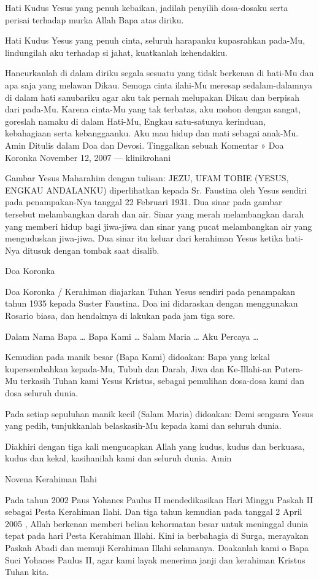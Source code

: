 \documentclass[a5paper,headsepline,titlepage,11pt,nnormalheadings,DIVcalc]{scrbook}
\begin{document}
Hati Kudus Yesus yang penuh kebaikan, jadilah penyilih dosa-dosaku serta perisai terhadap murka Allah Bapa atas diriku.

Hati Kudus Yesus yang penuh cinta, seluruh harapanku kupasrahkan pada-Mu, lindungilah aku terhadap si jahat, kuatkanlah kehendakku.

Hancurkanlah di dalam diriku segala sesuatu yang tidak berkenan di hati-Mu dan apa saja yang melawan Dikau. Semoga cinta ilahi-Mu meresap sedalam-dalamnya di dalam hati sanubariku agar aku tak pernah melupakan Dikau dan berpisah dari pada-Mu. Karena cinta-Mu yang tak terbatas, aku mohon dengan sangat, goreslah namaku di dalam Hati-Mu, Engkau satu-satunya kerinduan, kebahagiaan serta kebanggaanku. Aku mau hidup dan mati sebagai anak-Mu. Amin
Ditulis dalam Doa dan Devosi. Tinggalkan sebuah Komentar »
Doa Koronka
November 12, 2007 — klinikrohani

Gambar Yesus Maharahim dengan tulisan: JEZU, UFAM TOBIE (YESUS, ENGKAU ANDALANKU) diperlihatkan kepada Sr. Faustina oleh Yesus sendiri pada penampakan-Nya tanggal 22 Februari 1931. Dua sinar pada gambar tersebut melambangkan darah dan air. Sinar yang merah melambangkan darah yang memberi hidup bagi jiwa-jiwa dan sinar yang pucat melambangkan air yang menguduskan jiwa-jiwa. Dua sinar itu keluar dari kerahiman Yesus ketika hati-Nya ditusuk dengan tombak saat disalib.

Doa Koronka

Doa Koronka / Kerahiman diajarkan Tuhan Yesus sendiri pada penampakan tahun 1935 kepada Suster Faustina.
Doa ini didaraskan dengan menggunakan Rosario biasa, dan hendaknya di lakukan pada jam tiga sore.

Dalam Nama Bapa …
Bapa Kami …
Salam Maria …
Aku Percaya …

Kemudian pada manik besar (Bapa Kami) didoakan:
Bapa yang kekal kupersembahkan kepada-Mu, Tubuh dan Darah, Jiwa dan Ke-Illahi-an Putera-Mu terkasih Tuhan kami Yesus Kristus, sebagai pemulihan dosa-dosa kami dan dosa seluruh dunia.

Pada setiap sepuluhan manik kecil (Salam Maria) didoakan:
Demi sengsara Yesus yang pedih, tunjukkanlah belaskasih-Mu kepada kami dan seluruh dunia.

Diakhiri dengan tiga kali mengucapkan
Allah yang kudus, kudus dan berkuasa, kudus dan kekal, kasihanilah kami dan seluruh dunia. Amin


Novena Kerahiman Ilahi

Pada tahun 2002 Paus Yohanes Paulus II mendedikasikan Hari Minggu Paskah II sebagai Pesta Kerahiman Ilahi. Dan tiga tahun kemudian pada tanggal 2 April 2005 , Allah berkenan memberi beliau kehormatan besar untuk meninggal dunia tepat pada hari Pesta Kerahiman Illahi. Kini ia berbahagia di Surga, merayakan Paskah Abadi dan memuji Kerahiman Illahi selamanya. Doakanlah kami o Bapa Suci Yohanes Paulus II, agar kami layak menerima janji dan kerahiman Kristus Tuhan kita.
\end{document}
